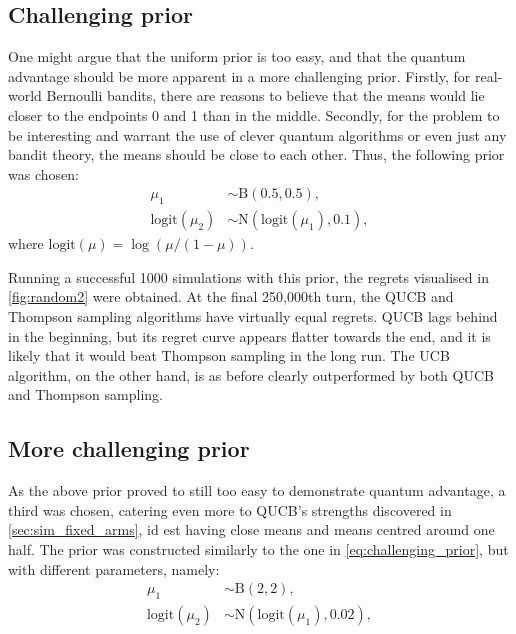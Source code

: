 \subsection{Challenging prior}
One might argue that the uniform prior is too easy, and that the quantum advantage should be more apparent in a more challenging prior.
Firstly, for real-world Bernoulli bandits, there are reasons to believe that the means would lie closer to the endpoints 0 and 1 than in the middle.
Secondly, for the problem to be interesting and warrant the use of clever quantum algorithms or even just any bandit theory, the means should be close to each other.
Thus, the following prior was chosen:
\begin{equation}
    \label{eq:challenging_prior}
    \begin{aligned}
        \mu_1               & \sim \text{B}(0.5, 0.5),                 \\
        \text{logit}(\mu_2) & \sim \text{N}(\text{logit}(\mu_1), 0.1),
    \end{aligned}
\end{equation}
where $\text{logit}(\mu) = \log(\mu/(1-\mu))$.

Running a successful 1000 simulations with this prior, the regrets visualised in \cref{fig:random2} were obtained.
At the final 250,000th turn, the QUCB and Thompson sampling algorithms have virtually equal regrets.
QUCB lags behind in the beginning, but its regret curve appears flatter towards the end, and it is likely that it would beat Thompson sampling in the long run.
The UCB algorithm, on the other hand, is as before clearly outperformed by both QUCB and Thompson sampling.

\subsection{More challenging prior}
As the above prior proved to still too easy to demonstrate quantum advantage, a third was chosen, catering even more to QUCB's strengths discovered in \cref{sec:sim_fixed_arms}, id est having close means and means centred around one half.
The prior was constructed similarly to the one in \cref{eq:challenging_prior}, but with different parameters, namely:
\begin{equation}
    \label{eq:more_challenging_prior}
    \begin{aligned}
        \mu_1               & \sim \text{B}(2, 2),                      \\
        \text{logit}(\mu_2) & \sim \text{N}(\text{logit}(\mu_1), 0.02),
    \end{aligned}
\end{equation}


